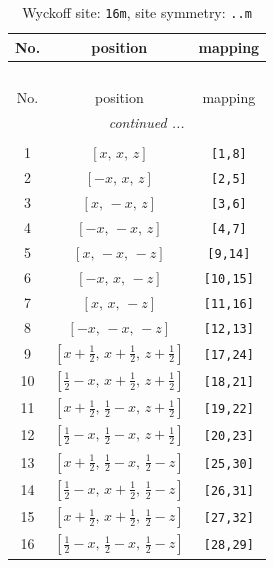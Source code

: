 \documentclass[fleqn,8pt]{jsarticle}
\begin{document}
\renewcommand{\arraystretch}{1.2}
\begin{longtable}{ccc}
\caption{Wyckoff site: {\tt 16m}, site symmetry: {\tt ..m}}
 \\
 \hline \hline
No. & position & mapping \\ \hline \endfirsthead

\multicolumn{2}{l}{\tablename\ \thetable{}} \\
 \hline \hline
No. & position & mapping \\ \hline \endhead

 \hline \hline
\multicolumn{2}{r}{\footnotesize\it continued ...} \\ \endfoot

 \hline \hline
\multicolumn{2}{r}{} \\ \endlastfoot

1 & $\left[ x,\, x,\, z \right]$ & {\tt [1,8]} \\ \hline
2 & $\left[ - x,\, x,\, z \right]$ & {\tt [2,5]} \\ \hline
3 & $\left[ x,\, - x,\, z \right]$ & {\tt [3,6]} \\ \hline
4 & $\left[ - x,\, - x,\, z \right]$ & {\tt [4,7]} \\ \hline
5 & $\left[ x,\, - x,\, - z \right]$ & {\tt [9,14]} \\ \hline
6 & $\left[ - x,\, x,\, - z \right]$ & {\tt [10,15]} \\ \hline
7 & $\left[ x,\, x,\, - z \right]$ & {\tt [11,16]} \\ \hline
8 & $\left[ - x,\, - x,\, - z \right]$ & {\tt [12,13]} \\ \hline
9 & $\left[ x + \frac{1}{2},\, x + \frac{1}{2},\, z + \frac{1}{2} \right]$ & {\tt [17,24]} \\ \hline
10 & $\left[ \frac{1}{2} - x,\, x + \frac{1}{2},\, z + \frac{1}{2} \right]$ & {\tt [18,21]} \\ \hline
11 & $\left[ x + \frac{1}{2},\, \frac{1}{2} - x,\, z + \frac{1}{2} \right]$ & {\tt [19,22]} \\ \hline
12 & $\left[ \frac{1}{2} - x,\, \frac{1}{2} - x,\, z + \frac{1}{2} \right]$ & {\tt [20,23]} \\ \hline
13 & $\left[ x + \frac{1}{2},\, \frac{1}{2} - x,\, \frac{1}{2} - z \right]$ & {\tt [25,30]} \\ \hline
14 & $\left[ \frac{1}{2} - x,\, x + \frac{1}{2},\, \frac{1}{2} - z \right]$ & {\tt [26,31]} \\ \hline
15 & $\left[ x + \frac{1}{2},\, x + \frac{1}{2},\, \frac{1}{2} - z \right]$ & {\tt [27,32]} \\ \hline
16 & $\left[ \frac{1}{2} - x,\, \frac{1}{2} - x,\, \frac{1}{2} - z \right]$ & {\tt [28,29]} \\
\end{longtable}
\end{document}
